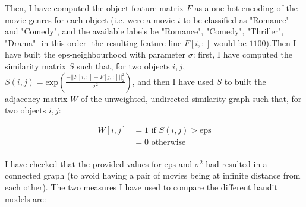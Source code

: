 \documentclass{article}
\begin{document}
Then, I have computed the object feature matrix $F$ as a one-hot encoding of the movie genres for each object (i.e. were a movie $i$ to be classified as "Romance" and "Comedy", and the available labels be "Romance", "Comedy", "Thriller", "Drama" -in this order- the resulting feature line $F[i, :]$ would be $1100$).Then I have built the $\text{eps}$-neighbourhood with parameter $\sigma$: first, I have computed the similarity matrix $S$ such that, for two objects $i,j$, $S(i,j) = \text{exp}(\frac{-||F[i,:]-F[j,:]||^{2}_{2}}{\sigma^{2}})$, and then I have used $S$ to built the adjacency matrix $W$ of the unweighted, undirected similarity graph such that, for two objects $i, j$:

\begin{equation}
\begin{split}
W[i, j] & = 1 \mbox{ if $S(i,j) > \text{eps}$}\\
& = 0 \mbox{ otherwise}\\ 
\end{split}
\end{equation}

I have checked that the provided values for $\text{eps}$ and $\sigma^{2}$ had resulted in a connected graph (to avoid having a pair of movies being at infinite distance from each other). The two measures I have used to compare the different bandit models are:
\end{document}
